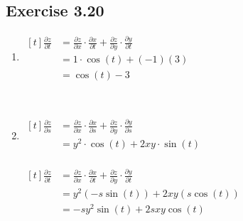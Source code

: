 {~~~}

\subsection*{Exercise 3.20}

\begin{enumerate}
    \item $\begin{aligned}[t]
        \frac{\partial z}{\partial t} & = \frac{\partial z}{\partial x} \cdot \frac{\partial x}{\partial t} + \frac{\partial z}{\partial y} \cdot \frac{\partial y}{\partial t} \\
         & = 1 \cdot \cos(t) + (-1)(3) \\
         & = \cos(t) - 3
    \end{aligned}$

    {~~~}

    \item $\begin{aligned}[t]
        \frac{\partial z}{\partial s} & = \frac{\partial z}{\partial x} \cdot \frac{\partial x}{\partial s} + \frac{\partial z}{\partial y} \cdot \frac{\partial y}{\partial s} \\
         & = y^2 \cdot \cos(t) + 2xy \cdot \sin(t) \\
    \end{aligned}$ 
    \qquad\qquad
    \begin{minipage}[t]{0.45\linewidth}
        $\begin{aligned}[t]
            \frac{\partial z}{\partial t} & = \frac{\partial z}{\partial x} \cdot \frac{\partial x}{\partial t} + \frac{\partial z}{\partial y} \cdot \frac{\partial y}{\partial t} \\
             & = y^2 (-s \sin(t)) + 2xy (s \cos(t)) \\
             & = -sy^2 \sin(t) + 2sxy \cos(t)
        \end{aligned}$
    \end{minipage}

    {~~~}
    

\end{enumerate}
